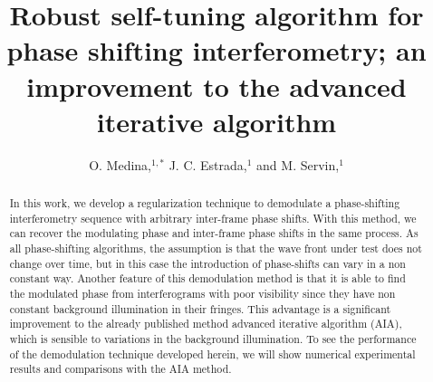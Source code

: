 \documentclass[letterpaper,12pt]{article}   %
\begin{document}
\title{Robust self-tuning algorithm for phase shifting interferometry; an improvement 
to the advanced iterative algorithm}

\author{O. Medina,$^{1,*}$ J. C. Estrada,$^{1}$ and M. Servin,$^{1}$}

\address{$^1$Centro de Investigaciones en Optica A. C., Loma del bosque 115, Col. Lomas 
del Campestre, Leon Guanajuato, 37150, Mexico}

\address{$^*$Corresponding author: orlandomedina@cio.mx}

\maketitle

\begin{abstract}
In this work, we develop a regularization technique to demodulate a  phase-shifting 
interferometry sequence with arbitrary inter-frame phase shifts. With this method, 
we can recover the modulating phase and inter-frame phase shifts in the same process. 
As all phase-shifting algorithms, the assumption is that the wave front under test does 
not change over time, but in this case the introduction of phase-shifts can vary in a 
non constant way. Another feature of this demodulation method is that it is able to find 
the modulated phase from interferograms with poor visibility since they have non 
constant background illumination in their fringes. This advantage is a significant 
improvement to the already published method advanced iterative algorithm (AIA), which 
is sensible to variations in the background illumination. To see the performance of the 
demodulation technique developed herein, we will show numerical experimental results and 
comparisons with the AIA method.
\end{abstract}
\end{document}
